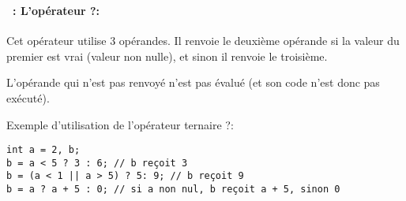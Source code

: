 \begin{frame}[containsverbatim]
  \frametitle{\secname}
  \framesubtitle{\subsecname~: L'opérateur ?:} 

  Cet opérateur utilise 3 opérandes. Il renvoie le deuxième opérande si la valeur du premier est vrai (valeur non nulle), et sinon il renvoie le troisième. 
  \par 
  L'opérande qui n'est pas renvoyé n'est pas évalué (et son code n'est donc pas exécuté).
  \vspace{0.3cm}
  \begin{exampleblock}{Exemple d'utilisation de l'opérateur ternaire ?:}
    \begin{verbatim}
int a = 2, b;
b = a < 5 ? 3 : 6; // b reçoit 3
b = (a < 1 || a > 5) ? 5: 9; // b reçoit 9
b = a ? a + 5 : 0; // si a non nul, b reçoit a + 5, sinon 0\end{verbatim}
  \end{exampleblock}
\end{frame}

